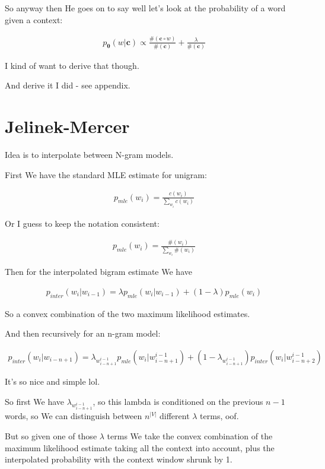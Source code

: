 \documentclass{article}
\newcommand{\vtheta}{\boldsymbol{\theta}}
\newcommand{\model}{p_{\vtheta}}
\newcommand{\context}{\boldsymbol{c}}
\begin{document}
	So anyway then He goes on to say well let's look at the probability of a word given a context:
	
	\begin{align}
		\model(w|\context) \propto \frac{\# (\context \circ w)}{\#(\context)} + \frac{\lambda}{\#(\context) }
	\end{align}
	
	I kind of want to derive that though. 
	
	And derive it I did - see appendix.

\newpage
\section{Jelinek-Mercer}
	
	Idea is to interpolate between N-gram models.
	
	First We have the standard MLE estimate for unigram:
	
	\begin{align}
		p_{mle}(w_i) = \frac{c(w_i)}{\sum_{w_i} c(w_i)}
	\end{align}
	
	Or I guess to keep the notation consistent:
	
	\begin{align}
		p_{mle}(w_i) = \frac{\#(w_i)}{\sum_{w_i} \#(w_i)}
	\end{align}
	
	Then for the interpolated bigram estimate We have
	
	\begin{align}
		p_{inter}(w_i|w_{i-1}) = \lambda p_{mle}(w_i|w_{i-1}) + (1-\lambda)p_{mle}(w_i)
	\end{align}
			
	So a convex combination of the two maximum likelihood estimates.
	
	And then recursively for an n-gram model:
	
	\begin{align}
		p_{inter}(w_i|w_{i-n+1}) = \lambda_{w^{i-1}_{i-n+1}} p_{mle}(w_i|w^{i-1}_{i-n+1}) + (1-\lambda_{w^{i-1}_{i-n+1}})p_{inter}(w_i|w^{i-1}_{i-n+2})
	\end{align}
			
	It's so nice and simple lol.
	
	So first We have $\lambda_{w^{i-1}_{i-n+1}}$, so this lambda is conditioned on the previous $n-1$ words, so We can distinguish between $n^{|V|}$ different $\lambda$ terms, oof. 
	
	But so given one of those $\lambda$ terms We take the convex combination of the maximum likelihood estimate taking all the context into account, plus the interpolated probability with the context window shrunk by 1. 
	
\end{document}
